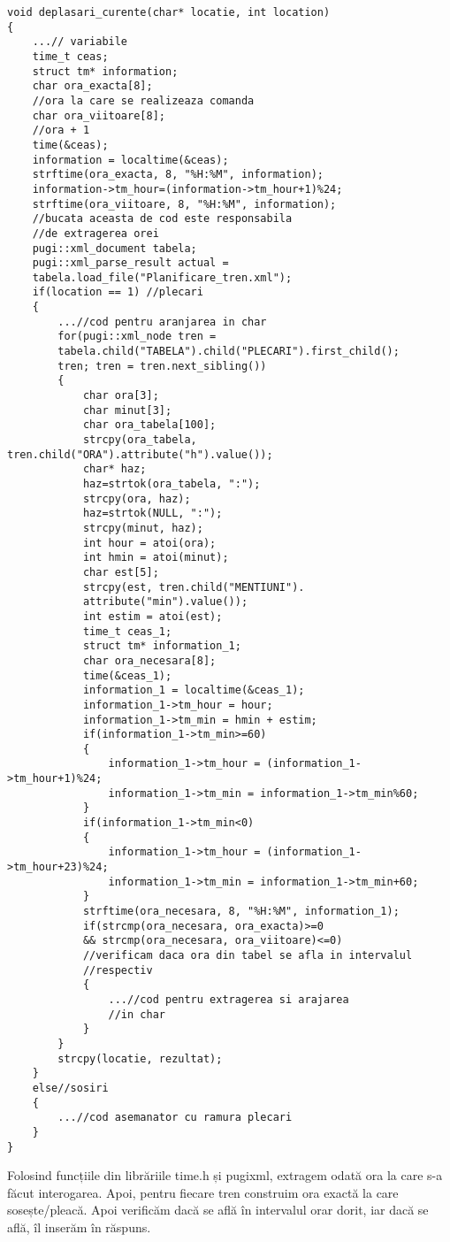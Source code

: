 \documentclass[runningheads]{llncs}
\begin{document}
\begin{verbatim}
void deplasari_curente(char* locatie, int location)
{
    ...// variabile
    time_t ceas;
    struct tm* information;
    char ora_exacta[8];
    //ora la care se realizeaza comanda
    char ora_viitoare[8];
    //ora + 1
    time(&ceas);
    information = localtime(&ceas);
    strftime(ora_exacta, 8, "%H:%M", information);
    information->tm_hour=(information->tm_hour+1)%24;
    strftime(ora_viitoare, 8, "%H:%M", information);
    //bucata aceasta de cod este responsabila
    //de extragerea orei
    pugi::xml_document tabela;
    pugi::xml_parse_result actual = 
    tabela.load_file("Planificare_tren.xml");
    if(location == 1) //plecari        
    {
        ...//cod pentru aranjarea in char
        for(pugi::xml_node tren = 
        tabela.child("TABELA").child("PLECARI").first_child(); 
        tren; tren = tren.next_sibling())
        {
            char ora[3];
            char minut[3];
            char ora_tabela[100];
            strcpy(ora_tabela, tren.child("ORA").attribute("h").value());
            char* haz;
            haz=strtok(ora_tabela, ":");
            strcpy(ora, haz);
            haz=strtok(NULL, ":");
            strcpy(minut, haz);
            int hour = atoi(ora);
            int hmin = atoi(minut);
            char est[5];
            strcpy(est, tren.child("MENTIUNI").
            attribute("min").value());
            int estim = atoi(est);
            time_t ceas_1;
            struct tm* information_1;
            char ora_necesara[8];
            time(&ceas_1);
            information_1 = localtime(&ceas_1);
            information_1->tm_hour = hour;
            information_1->tm_min = hmin + estim;
            if(information_1->tm_min>=60)
            {
                information_1->tm_hour = (information_1->tm_hour+1)%24;
                information_1->tm_min = information_1->tm_min%60;
            }
            if(information_1->tm_min<0)
            {
                information_1->tm_hour = (information_1->tm_hour+23)%24;
                information_1->tm_min = information_1->tm_min+60;
            }
            strftime(ora_necesara, 8, "%H:%M", information_1);
            if(strcmp(ora_necesara, ora_exacta)>=0
            && strcmp(ora_necesara, ora_viitoare)<=0)
            //verificam daca ora din tabel se afla in intervalul
            //respectiv
            {
                ...//cod pentru extragerea si arajarea
                //in char
            }
        }
        strcpy(locatie, rezultat);
    }
    else//sosiri
    {
        ...//cod asemanator cu ramura plecari
    }
}
\end{verbatim}
Folosind funcțiile din librăriile time.h și pugixml, extragem odată ora la care s-a făcut interogarea. Apoi, pentru fiecare tren construim ora exactă la care sosește/pleacă. Apoi verificăm dacă se află în intervalul orar dorit, iar dacă se află, îl inserăm în răspuns.
\end{document}
